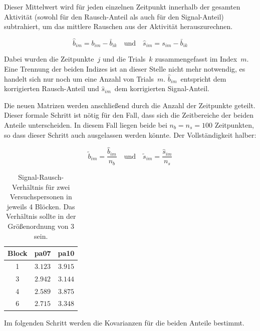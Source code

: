 \documentclass[doc,a4paper,12pt]{apa6}
\renewcommand{\arraystretch}{1.2}
\begin{document}
Dieser Mittelwert wird für jeden einzelnen Zeitpunkt innerhalb der gesamten Aktivität (sowohl für den Rausch-Anteil als auch für den Signal-Anteil) subtrahiert, um das mittlere Rauschen aus der Aktivität herauszurechnen.

\begin{equation}
\hat{b}_{im} = b_{im} - \bar{b}_{ik} \quad \text{und} \quad \hat{s}_{im} = s_{im} - \bar{b}_{ik}
\end{equation}

Dabei wurden die Zeitpunkte~$j$ und die Trials~$k$ zusammengefasst im Index~$m$. Eine Trennung der beiden Indizes ist an dieser Stelle nicht mehr notwendig, es handelt sich nur noch um eine Anzahl von Trials~$m$. $\hat{b}_{im}$~entspricht dem korrigierten Rausch-Anteil und $\hat{s}_{im}$~dem korrigierten Signal-Anteil.

Die neuen Matrizen werden anschließend durch die Anzahl der Zeitpunkte geteilt. Dieser formale Schritt ist nötig für den Fall, dass sich die Zeitbereiche der beiden Anteile unterscheiden. In diesem Fall liegen beide bei $n_b = n_s = 100$ Zeitpunkten, so dass dieser Schritt auch ausgelassen werden könnte. Der Vollständigkeit halber:

\begin{equation}
\tilde{b}_{im} = \frac{\hat{b}_{im}}{n_b} \quad \text{und} \quad \tilde{s}_{im} = \frac{\hat{s}_{im}}{n_s}
\end{equation}

\begin{table}[t]
  \caption{}
  \label{tab:snr}
  \vspace*{3mm}
  \centering
  \setlength{\tabcolsep}{1cm}
  \renewcommand{\arraystretch}{1.5}
  \begin{tabular}{ccc}
  \hline
  Block & pa07 & pa10 \\
  \hline
  1 & $3.123$ & $3.915$\\
  3 & $2.942$ & $3.144$\\
  4 & $2.589$ & $3.875$\\
  6 & $2.715$ & $3.348$\\
  \hline
  \end{tabular}
  \vspace*{3mm}
  \caption*{Signal-Rausch-Verhältnis für zwei Versuchspersonen in jeweils 4 Blöcken. Das Verhältnis sollte in der Größenordnung von $3$ sein.}
\end{table}

Im folgenden Schritt werden die Kovarianzen für die beiden Anteile bestimmt.
\end{document}
